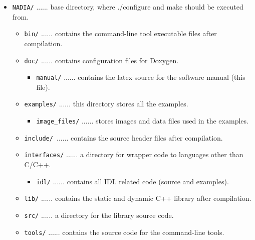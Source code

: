 \documentclass[]{nadia}
\begin{document}
\begin{itemize}
   \item[] {\tt NADIA/} ...... base directory, where ./configure and make should be executed from.
   \begin{itemize}
      \item[] {\tt bin/} ...... contains the command-line tool executable files after compilation.
      \item[] {\tt doc/} ...... contains configuration files for Doxygen.
      \begin{itemize}
         \item[] {\tt manual/} ...... contains the latex source for the software manual (this file).
      \end{itemize}
      \item[] {\tt examples/} ...... this directory stores all the examples.
      \begin{itemize}
         \item[] {\tt image\_files/} ...... stores images and data files used in the examples.
      \end{itemize}
      \item[] {\tt include/ }...... contains the source header files after compilation.
      \item[] {\tt interfaces/} ...... a directory for wrapper code to languages other than C/C++.
      \begin{itemize}
         \item[] {\tt idl/} ...... contains all IDL related code (source and examples).
      \end{itemize}
      \item[] {\tt lib/} ...... contains the static and dynamic C++ library after compilation.
      \item[] {\tt src/} ...... a directory for the library source code.
      \item[] {\tt tools/} ...... contains the source code for the command-line tools.
   \end{itemize}
\end{itemize}



\end{document}
